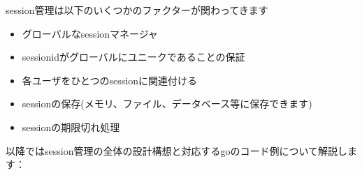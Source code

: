 session管理は以下のいくつかのファクターが関わってきます

\begin{itemize}
  \item グローバルなsessionマネージャ
  \item sessionidがグローバルにユニークであることの保証
  \item 各ユーザをひとつのsessionに関連付ける
  \item sessionの保存(メモリ、ファイル、データベース等に保存できます)
  \item sessionの期限切れ処理
\end{itemize}

以降ではsession管理の全体の設計構想と対応するgoのコード例について解説します：
